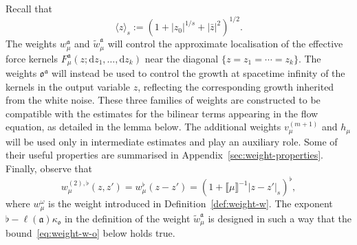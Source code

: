 \documentclass{article}
\numberwithin{equation}{section}
\newcommand{\assign}{:=}
\newcommand{\mathd}{\mathrm{d}}
\theoremstyle{plain}
\theoremstyle{definition}
\begin{document}
Recall that
\[ \langle z \rangle_s \assign (1 + | z_0 |^{1 / s} + | \bar{z} |^2)^{1 / 2} .
\]
The weights $w^{\mathfrak{a}}_{\mu}$ and ${\tilde{w}^{\mathfrak{a}}_{\mu}}$
will control the approximate localisation of the effective force kernels
$F^{\mathfrak{a}}_{\mu} (z ; \mathd z_1, \ldots, \mathd z_k)$ near the
diagonal $\{ z = z_1 = \cdots = z_k \}$. The weights
$\mathfrak{o}^{\mathfrak{a}}$ will instead be used to control the growth at
spacetime infinity of the kernels in the output variable $z$, reflecting the
corresponding growth inherited from the white noise. These three families of
weights are constructed to be compatible with the estimates for the bilinear
terms appearing in the flow equation, as detailed in the lemma below. The
additional weights ${v_{\mu}^{(m + 1)}}$ and $h_{\mu}$ will be used only in
intermediate estimates and play an auxiliary role. Some of their useful
properties are summarised in Appendix~\ref{sec:weight-properties}. Finally,
observe that
\[ w_{\mu}^{(2), \flat} (z, z') = w^{\flat}_{\mu} (z - z') = (1 + \llbracket
   \mu \rrbracket^{- 1} | z - z' |_s)^{\flat}, \]
where $w^{\omega}_{\mu}$ is the weight introduced in Definition~\ref{def:weight-w}.
The exponent $\flat - \ell (\mathfrak{a}) \kappa_{\mathfrak{o}}$ in the
definition of the weight $\tilde{w}^{\mathfrak{a}}_{\mu}$ is designed in such
a way that the bound~\eqref{eq:weight-w-o} below holds true.
\end{document}
